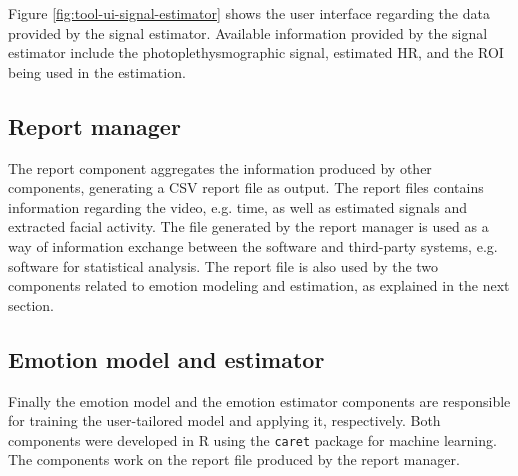 Figure \ref{fig:tool-ui-signal-estimator} shows the user interface regarding the data provided by the signal estimator. Available information provided by the signal estimator include the photoplethysmographic signal, estimated HR, and the ROI being used in the estimation.

\subsection{Report manager}

The report component aggregates the information produced by other components, generating a CSV report file as output. The report files contains information regarding the video, e.g. time, as well as estimated signals and extracted facial activity. The file generated by the report manager is used as a way of information exchange between the software and third-party systems, e.g. software for statistical analysis. The report file is also used by the two components related to emotion modeling and estimation, as explained in the next section.

\subsection{Emotion model and estimator}

Finally the emotion model and the emotion estimator components are responsible for training the user-tailored model and applying it, respectively. Both components were developed in R using the \texttt{caret} package for machine learning. The components work on the report file produced by the report manager.
